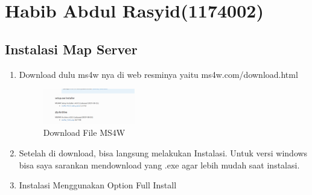 \section{Habib Abdul Rasyid(1174002)}
\subsection{Instalasi Map Server}
\begin{enumerate}
    \item Download dulu ms4w nya di web resminya yaitu ms4w.com/download.html
    \hfill\break
    \begin{figure}[H]
		\includegraphics[width=4cm]{figures/1174002/4/1.png}
		\centering
		\caption{Download File MS4W}
    \end{figure}
    \hfill\break

    \item Setelah di download, bisa langsung melakukan Instalasi. Untuk versi windows bisa saya sarankan mendownload yang .exe agar lebih mudah saat instalasi.
    \item Instalasi Menggunakan Option Full Install

\end{enumerate}


